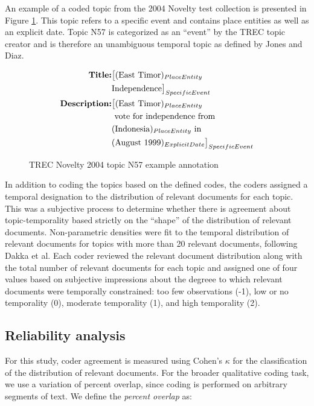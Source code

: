\documentclass{asist}
\begin{document}
An example of a coded topic from the 2004 Novelty test collection is presented in Figure \ref{fig.example}.  This topic refers to a specific event and contains place entities as well as an explicit date.  Topic N57 is categorized as an ``event'' by the TREC topic creator and is therefore an unambiguous temporal topic as defined by Jones and Diaz.

\begin{figure}[!ht]
\begin{equation*}
\begin{split}
\mbox{\bf{Title}:} & \big[(\mbox{East Timor})_{PlaceEntity} \\
	& \mbox{Independence}\big]_{SpecificEvent} \\
\mbox{\bf{Description}:} & \big[  (\mbox{East Timor})_{PlaceEntity} \\
	& \mbox{ vote for independence from } \\
	& (\mbox{Indonesia})_{PlaceEntity} \mbox{ in } \\
	& (\mbox{August 1999})_{ExplicitDate}\big]_{SpecificEvent}
\end{split}
\end{equation*}
\caption{TREC Novelty 2004 topic N57 example annotation}
\label{fig.example}
\end{figure}

In addition to coding the topics based on the defined codes, the coders assigned a temporal designation to the distribution of relevant documents for each topic. This was a subjective process to determine whether there is agreement about topic-temporality based strictly on the ``shape'' of the distribution of relevant documents. Non-parametric densities were fit to the temporal distribution of relevant documents for topics with more than 20 relevant documents, following Dakka et al. Each coder reviewed the relevant document distribution along with the total number of relevant documents for each topic and assigned one of four values based on subjective impressions about the degreee to which relevant documents were temporally constrained:  too few observations (-1), low or no temporality (0), moderate temporality (1), and high temporality (2). 
\subsection{Reliability analysis}

For this study, coder agreement is measured using Cohen's $\kappa$ for the classification of the distribution of relevant documents. For the broader qualitative coding task, we use a variation of percent overlap, since coding is performed on arbitrary segments of text. We define the \emph{percent overlap} as:
\end{document}
